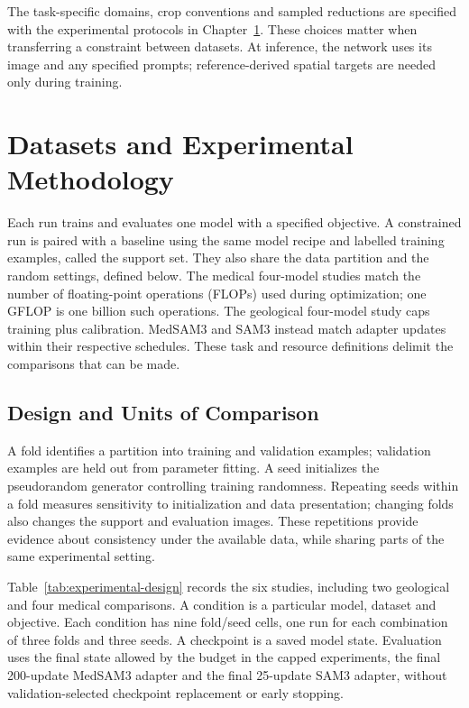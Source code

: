 \documentclass[12pt,a4paper]{article}
\begin{document}
The task-specific domains, crop conventions and sampled reductions
are specified with the experimental protocols in
Chapter~\ref{sec:methodology}. These choices matter when transferring a
constraint between datasets. At inference, the network uses its image
and any specified prompts; reference-derived spatial targets are needed
only during training.

\clearpage
\section{Datasets and Experimental Methodology}
\label{sec:methodology}

Each run trains and evaluates one model with a specified objective. A
constrained run is paired with a baseline using the same model recipe and
labelled training examples, called the support set. They also share the data
partition and the random settings, defined below. The medical four-model
studies match the number of floating-point operations (FLOPs) used during
optimization; one GFLOP is one billion such operations. The geological
four-model study caps training plus calibration. MedSAM3 and SAM3 instead
match adapter updates within their respective schedules. These task and
resource definitions delimit the comparisons that can be made.

\subsection{Design and Units of Comparison}
\label{sec:experimental-structure}

A fold identifies a partition into training and validation examples;
validation examples are held out from parameter fitting. A seed initializes
the pseudorandom generator controlling training randomness. Repeating seeds
within a fold measures sensitivity to initialization and data presentation;
changing folds also changes the support and evaluation images. These
repetitions provide evidence about consistency under the available data,
while sharing parts of the same experimental setting.

Table~\ref{tab:experimental-design} records the six studies, including two
geological and four medical comparisons. A condition is a particular model,
dataset and objective. Each condition has nine fold/seed cells, one run for
each combination of three folds and three seeds. A checkpoint is a saved
model state. Evaluation uses the final state allowed by the budget in the
capped experiments, the final 200-update MedSAM3 adapter and the final
25-update SAM3 adapter, without validation-selected checkpoint replacement
or early stopping.
\end{document}
